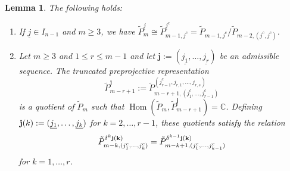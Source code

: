 \documentclass{amsart}
\newtheorem{lemma}[theorem]{Lemma}
\numberwithin{equation}{section}
\newcommand{\uj}{{\underline j}}
\newcommand{\CC}{\mathbb{C}}
\newcommand{\Hom}{\operatorname{Hom}}
\begin{document}
\begin{lemma}The following holds:
  \label{le:preprojective lifts}
  \begin{enumerate}
    \item If $\uj\in I_{n-1}$ and $m\geq 3$, we have $\tilde P_{m}^{\uj}\cong \tilde P_{m-1,j^c}^{\uj^c}= \tilde P_{m-1,j^c}/\tilde P_{m-2,(j^c,j^c)}$.
		\item Let $m\geq 3$ and $1\leq r\leq m-1$ and let $\mathbf j:=(\underline{j_1},\ldots,\underline{j_r})$ be an admissible sequence. The truncated preprojective representation
		$$\tilde P^{\mathbf j}_{m-r+1}:=\tilde P_{m-r+1,(j_1^c,\ldots,j_{r-1}^c)}^{(j_{r-1}^c,j_{r,1},\ldots,j_{r,s})}$$
	 is a quotient of $\tilde P_m$ such that $\Hom(\tilde P_m,\tilde P^{\mathbf j}_{m-r+1})=\CC$. Defining ${\bf j}(k):=(\underline{j_1},\ldots,\underline{j_k})$ for $k=2,\ldots,r-1$, these quotients satisfy the relation
		\[\tilde P_{m-k,(j_1^c,\ldots,j_k^c)}^{\delta^k{\bf j(k)}}=\tilde P_{m-k+1,(j_1^c,\ldots,j_{k-1}^c)}^{\delta^{k-1}\bf j(k)}\]
		for $k=1,\ldots,r$.
  \end{enumerate}
\end{lemma}
\end{document}
